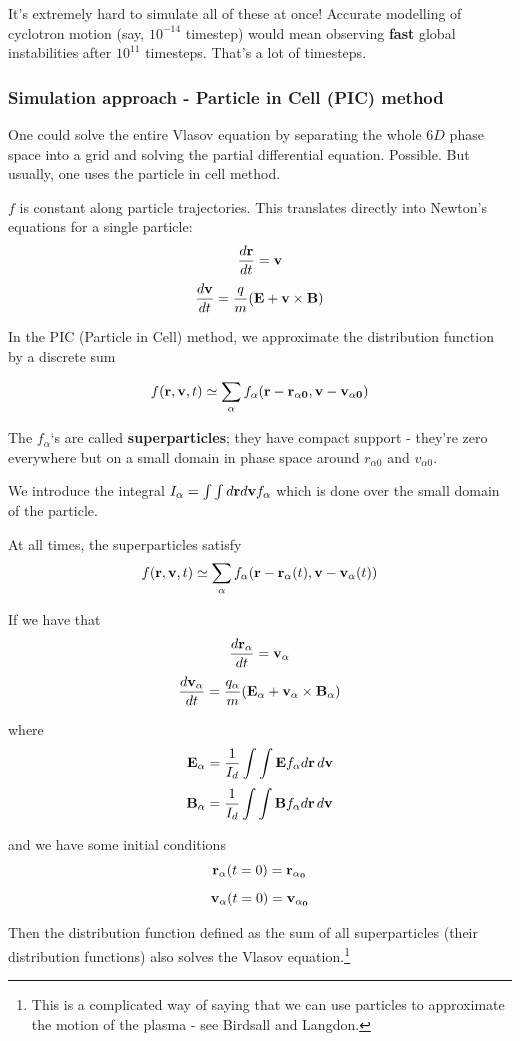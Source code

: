 It's extremely hard to simulate all of these at once! Accurate modelling of cyclotron motion (say, $10^{-14}$ timestep) would mean observing \textbf{fast} global instabilities after $10^11$ timesteps. That's a lot of timesteps.

\subsubsection{Simulation approach - Particle in Cell (PIC) method}

One could solve the entire Vlasov equation by separating the whole $6D$ phase space into a grid and solving the partial differential equation. Possible. But usually, one uses the particle in cell method.

$f$ is constant along particle trajectories. This translates directly into Newton's equations for a single particle:
\[ \frac{d \mathbf{r}}{d t}=\mathbf{v} \]
\[ \frac{d \mathbf{v}}{d t}=\frac{q}{m}(\mathbf{E} + \mathbf{v} \times \mathbf{B}) \]

In the PIC (Particle in Cell) method, we approximate the distribution function by a discrete sum

\[f(\mathbf{r}, \mathbf{v}, t) \simeq \sum_\alpha f_\alpha (\mathbf{r} - \mathbf{r_{\alpha 0}}, \mathbf{v} - \mathbf{v_{\alpha 0}})\]

The $f_{\alpha}$`s are called \textbf{superparticles}; they have compact support - they're zero everywhere but on a small domain in phase space around $r_{\alpha 0}$ and $v_{\alpha 0}$. 

We introduce the integral $I_{\alpha} = \int \int d\mathbf{r} d\mathbf{v} f_{\alpha}$ which is done over the small domain of the particle.

At all times, the superparticles satisfy
\[f(\mathbf{r}, \mathbf{v}, t) \simeq \sum_\alpha f_\alpha (\mathbf{r} - \mathbf{r_{\alpha}}(t), \mathbf{v} - \mathbf{v_{\alpha}}(t))\]

If we have that
\[ \frac{d \mathbf{r_{\alpha}}}{d t}=\mathbf{v_{\alpha}} \]
\[ \frac{d \mathbf{v_{\alpha}}}{d t}=\frac{q_{\alpha}}{m}(\mathbf{E_{\alpha}} + \mathbf{v_{\alpha}} \times \mathbf{B_{\alpha}}) \]

where
\[ \mathbf{E_{\alpha}} = \frac{1}{I_d} \int \int \mathbf{E} f_{\alpha} d\mathbf{r}\,d\mathbf{v} \]
\[ \mathbf{B_{\alpha}} = \frac{1}{I_d} \int \int \mathbf{B} f_{\alpha} d\mathbf{r}\,d\mathbf{v} \]

and we have some initial conditions
\[ \mathbf{r_{\alpha}} (t=0) = \mathbf{r_{\alpha_0}} \]
\[ \mathbf{v_{\alpha}} (t=0) = \mathbf{v_{\alpha_0}} \]

Then the distribution function defined as the sum of all superparticles (their distribution functions) also solves the Vlasov equation.\footnote{This is a complicated way of saying that we can use particles to approximate the motion of the plasma - see Birdsall and Langdon.}

